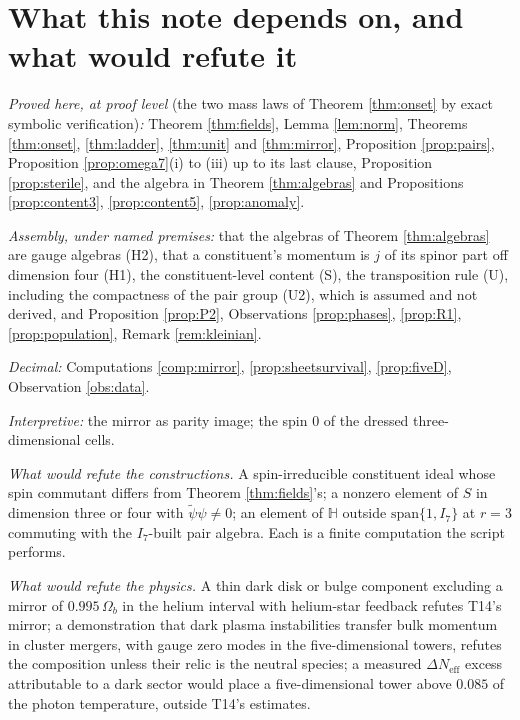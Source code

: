 \documentclass[11pt]{article}
\theoremstyle{definition}
\newcommand{\HH}{\mathbb{H}}
\newcommand{\rev}[1]{\widetilde{#1}}
\newcommand{\Neff}{N_{\mathrm{eff}}}
\begin{document}
\section{What this note depends on, and what would refute it}\label{sec:refute}

\emph{Proved here, at proof level} (the two mass laws of Theorem \ref{thm:onset} by exact symbolic verification)\emph{:} Theorem \ref{thm:fields}, Lemma \ref{lem:norm}, Theorems \ref{thm:onset}, \ref{thm:ladder}, \ref{thm:unit} and \ref{thm:mirror}, Proposition \ref{prop:pairs}, Proposition \ref{prop:omega7}(i) to (iii) up to its last clause, Proposition \ref{prop:sterile}, and the algebra in Theorem \ref{thm:algebras} and Propositions \ref{prop:content3}, \ref{prop:content5}, \ref{prop:anomaly}.

\emph{Assembly, under named premises:} that the algebras of Theorem \ref{thm:algebras} are gauge algebras (H2), that a constituent's momentum is $j$ of its spinor part off dimension four (H1), the constituent-level content (S), the transposition rule (U), including the compactness of the pair group (U2), which is assumed and not derived, and Proposition \ref{prop:P2}, Observations \ref{prop:phases}, \ref{prop:R1}, \ref{prop:population}, Remark \ref{rem:kleinian}.

\emph{Decimal:} Computations \ref{comp:mirror}, \ref{prop:sheetsurvival}, \ref{prop:fiveD}, Observation \ref{obs:data}.

\emph{Interpretive:} the mirror as parity image; the spin $0$ of the dressed three-dimensional cells.

\emph{What would refute the constructions.} A spin-irreducible constituent ideal whose spin commutant differs from Theorem \ref{thm:fields}'s; a nonzero element of $S$ in dimension three or four with $\rev{\psi}\psi \neq 0$; an element of $\HH$ outside $\mathrm{span}\{1, I_{7}\}$ at $r = 3$ commuting with the $I_{7}$-built pair algebra. Each is a finite computation the script performs.

\emph{What would refute the physics.} A thin dark disk or bulge component excluding a mirror of $0.995\,\Omega_{b}$ in the helium interval with helium-star feedback refutes T14's mirror; a demonstration that dark plasma instabilities transfer bulk momentum in cluster mergers, with gauge zero modes in the five-dimensional towers, refutes the composition unless their relic is the neutral species; a measured $\Delta\Neff$ excess attributable to a dark sector would place a five-dimensional tower above $0.085$ of the photon temperature, outside T14's estimates.
\end{document}
